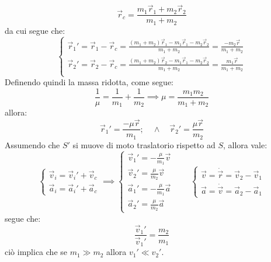 \documentclass[11pt, a4paper, openright]{book}
\theoremstyle{plain}
\theoremstyle{definition}
\begin{document}
\begin{equation}
    \vec{r}_c = \frac{m_1\vec{r}_1 + m_2\vec{r}_2}{m_1 + m_2}
\end{equation}
da cui segue che:
\begin{equation}
    \begin{cases}
        \displaystyle \vec{r}_1' = \vec{r}_1 - \vec{r}_c = \frac{(m_1 + m_2)\vec{r}_1 - m_1\vec{r}_1 - m_2\vec{r}_2}{m_1 + m_2} = \frac{-m_2\vec{r}}{m_1 + m_2} \\[1em]
        
        \displaystyle \vec{r}_2' = \vec{r}_2 - \vec{r}_c = \frac{(m_1 + m_2)\vec{r}_2 - m_1\vec{r}_1 - m_2\vec{r}_2}{m_1 + m_2} = \frac{m_1\vec{r}}{m_1 + m_2} \\
    \end{cases}
\end{equation}
Definendo quindi la massa ridotta, come segue:
\begin{equation}
    \frac{1}{\mu} = \frac{1}{m_1} + \frac{1}{m_2} \implies \mu = \frac{m_1m_2}{m_1 + m_2}
\end{equation}
allora:
\begin{equation}
    \vec{r}_1' = \frac{-\mu \vec{r}}{m_1}; \quad \wedge \quad \vec{r}_2' = \frac{\mu \vec{r}}{m_2} 
\end{equation}
Assumendo che $S'$ si muove di moto traslatorio rispetto ad $S$, allora vale:
\begin{equation}
    \begin{cases}
        \displaystyle \vec{v}_i = \vec{v}_i' + \vec{v}_c \\
        \displaystyle \vec{a}_i = \vec{a}_i' + \vec{a}_c 
    \end{cases} \implies
    \begin{cases}
        \displaystyle \vec{v}_1' = -\frac{\mu}{m_1}\vec{v} \\[1em]
        \displaystyle \vec{v}_2' = \frac{\mu}{m_2}\vec{v} \\[1em]
        \displaystyle \vec{a}_1' = -\frac{\mu}{m_1}\vec{a} \\[1em]
        \displaystyle \vec{a}_2' = \frac{\mu}{m_2}\vec{a}
    \end{cases}
    \quad \quad \begin{cases}
        \displaystyle \vec{v} = \dot{\vec{r}} = \vec{v}_2 - \vec{v}_1  \\[1em]
        \displaystyle \vec{a} = \dot{\vec{v}} = \vec{a}_2 - \vec{a}_1 
    \end{cases}
\end{equation}
segue che:
\begin{equation}
    \frac{\vec{v}_1'}{\vec{v}_1'} = \frac{m_2}{m_1}
\end{equation}
ciò implica che se $m_1 \gg m_2$ allora $v_1' \ll v_2'$.
\end{document}

